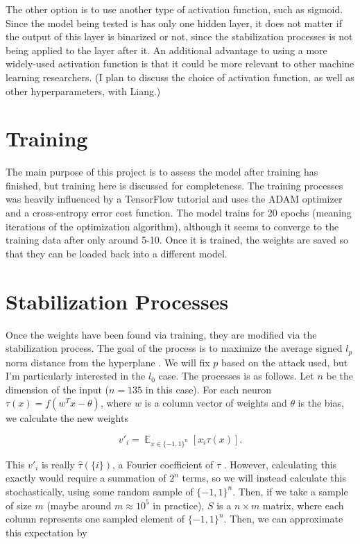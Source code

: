 \documentclass{article}
\DeclareMathOperator*{\E}{\mathbb{E}}
\DeclareMathOperator{\1}{\mathbb{1}}
\begin{document}
The other option is to use another type of activation function, such as sigmoid. Since the model being tested is has only one hidden layer, it does not matter if the output of this layer is binarized or not, since the stabilization processes is not being applied to the layer after it. An additional advantage to using a more widely-used activation function is that it could be more relevant to other machine learning researchers. (I plan to discuss the choice of activation function, as well as other hyperparameters, with Liang.)

\section{Training}

The main purpose of this project is to assess the model after training has finished, but training here is discussed for completeness. The training processes was heavily influenced by a TensorFlow tutorial \cite{tftut} and uses the ADAM optimizer and a cross-entropy error cost function. The model trains for 20 epochs (meaning iterations of the optimization algorithm), although it seems to converge to the training data after only around 5-10. Once it is trained, the weights are saved so that they can be loaded back into a different model.

\section{Stabilization Processes}

Once the weights have been found via training, they are modified via the stabilization process. The goal of the process is to maximize the average signed $l_p$ norm distance from the hyperplane \cite{cod2}. We will fix $p$ based on the attack used, but I'm particularly interested in the $l_0$ case. The processes is as follows. Let $n$ be the dimension of the input ($n = 135$ in this case). For each neuron $\tau(x) = f(w^Tx - \theta)$, where $w$ is a column vector of weights and $\theta$ is the bias, we calculate the new weights

$$v'_i = \E_{x \in \{-1, 1\}^n}[x_i \tau(x)].$$

This $v'_i$ is really $\hat\tau(\{i\})$, a Fourier coefficient of $\tau$ \cite{bool}. However, calculating this exactly would require a summation of $2^{n}$ terms, so we will instead calculate this stochastically, using some random sample of $\{-1, 1\}^n$. Then, if we take a sample of size $m$ (maybe around $m \approx 10^5$ in practice), $S$ is a $n \times m$ matrix, where each column represents one sampled element of $\{-1, 1\}^n$. Then, we can approximate this expectation by
\end{document}
